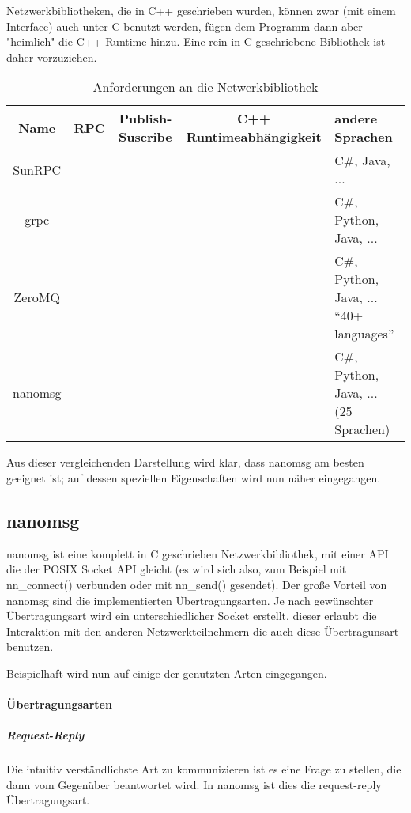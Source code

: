 Netzwerkbibliotheken, die in C++ geschrieben wurden, k{\"{o}}nnen zwar (mit einem Interface) auch unter C benutzt werden, f{\"{u}}gen dem Programm
dann aber "heimlich" die C++ Runtime hinzu. Eine rein in C geschriebene Bibliothek ist daher vorzuziehen.

\clearpage %
\begin{table}[h]
\centering
\begin{tabu}{c | c | c | c | p{5cm}}
	\toprule
	Name & RPC & Publish-Suscribe & C++ Runtimeabh{\"{a}}ngigkeit & andere Sprachen \\
	\midrule
	SunRPC & \checkmark & \xmark & \checkmark & C\#, Java, ... \\
	grpc\cite{grpc} & \checkmark & \xmark & \xmark & C\#, Python, Java, ... \\
	ZeroMQ\cite{zeromq} & \xmark & \checkmark & \xmark & C\#, Python, Java, ... \enquote{40+ languages} \\
	nanomsg\cite{nanomsg} & \xmark & \checkmark & \checkmark & C\#, Python, Java, ... (25 Sprachen) \\
	\bottomrule
\end{tabu}
\caption{Anforderungen an die Netwerkbibliothek}
\end{table}

Aus dieser vergleichenden Darstellung wird klar, dass nanomsg am besten geeignet ist; auf dessen speziellen Eigenschaften wird nun n{\"{a}}her eingegangen.

\subsection{nanomsg}
nanomsg ist eine komplett in C geschrieben Netzwerkbibliothek, mit einer API die der POSIX Socket API gleicht (es wird sich also, zum Beispiel mit nn\_connect() verbunden oder mit nn\_send() gesendet).
Der gro{\ss}e Vorteil von nanomsg sind die implementierten {\"{U}}bertragungsarten. Je nach gew{\"{u}}nschter {\"{U}}bertragungsart wird ein unterschiedlicher Socket erstellt, dieser erlaubt die
Interaktion mit den anderen Netzwerkteilnehmern die auch diese {\"{U}}bertragunsart benutzen.

Beispielhaft wird nun auf einige der genutzten Arten eingegangen.

\paragraph{{\"{U}}bertragungsarten}
\subparagraph{Request-Reply} Die intuitiv verst{\"{a}}ndlichste Art zu kommunizieren ist es eine Frage zu stellen, die dann vom Gegen{\"{u}}ber beantwortet wird. In nanomsg ist dies die request-reply
{\"{U}}bertragungsart.

